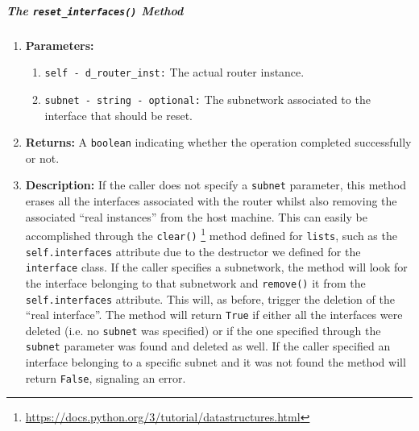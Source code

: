         \subparagraph{The \texttt{reset\_interfaces()} Method}
            \begin{enumerate}
                \item \textbf{Parameters:}
                \begin{enumerate}
                    \item \texttt{self - d\_router\_inst:} The actual router instance.
                    \item \texttt{subnet - string - optional:} The subnetwork associated to the interface that should be reset.
                \end{enumerate}
                \item \textbf{Returns:} A \texttt{boolean} indicating whether the operation completed successfully or not.
                \item \textbf{Description:} If the caller does not specify a \texttt{subnet} parameter, this method erases all the interfaces associated with the router whilst also removing the associated ``real instances'' from the host machine. This can easily be accomplished through the \texttt{clear()} \footnote{\href{https://docs.python.org/3/tutorial/datastructures.html}{https://docs.python.org/3/tutorial/datastructures.html}} method defined for \texttt{lists}, such as the \texttt{self.interfaces} attribute due to the destructor we defined for the \texttt{interface} class. If the caller specifies a subnetwork, the method will look for the interface belonging to that subnetwork and \texttt{remove()} it from the \texttt{self.interfaces} attribute. This will, as before, trigger the deletion of the ``real interface''. The method will return \texttt{True} if either all the interfaces were deleted (i.e. no \texttt{subnet} was specified) or if the one specified through the \texttt{subnet} parameter was found and deleted as well. If the caller specified an interface belonging to a specific subnet and it was not found the method will return \texttt{False}, signaling an error.
            \end{enumerate}

